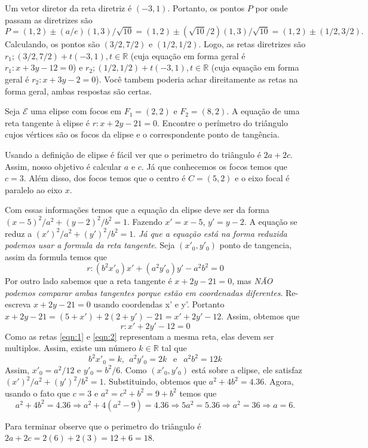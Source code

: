 \documentclass[11pt]{exam}
\begin{document}
\begin{questions}
\begin{parts}
\begin{solution}
       Um vetor diretor da reta diretriz é $(-3,1)$. Portanto, os pontos
       $P$ por onde passam as diretrizes são   
       $$P=(1,2)\pm (a/e)(1,3)/\sqrt{10}=(1,2)\pm (\sqrt{10}/2)(1,3)/\sqrt{10}=(1,2)\pm(1/2,3/2). $$
       Calculando, os pontos são $(3/2,7/2)$ e $(1/2,1/2)$.
       Logo, as retas diretrizes são 
       $r_{1}; (3/2,7/2)+t(-3,1), t \in \mathbb{R}$ 
       (cuja equação em forma geral é 
       $r_1: x+3y-12=0$) e 
       $r_{2}; (1/2,1/2)+t(-3,1), t \in \mathbb{R}$ 
       (cuja equação em forma geral é 
       $r_2: x+3y-2=0$). 
       Você tambem poderia achar direitamente 
       as retas na forma geral, ambas respostas são certas.  
       \end{solution}      
      \end{parts}
 \question[20] Seja $\mathcal{E}$ uma elipse com focos em 
 $F_1=(2,2)$ e $F_2=(8,2)$. A equação de uma reta tangente à elipse 
 é $r: x+2y-21=0$. Encontre o perímetro do triângulo cujos vértices são os focos da elipse e o correspondente ponto de tangência. 
   \begin{solution}
   Usando a definição de elipse é fácil ver que 
   o perimetro do triângulo é  $2a+2c$. Assim, nosso objetivo é calcular 
   $a$ e $c$. Já que conhecemos os focos temos que $c=3$. Além disso, dos focos temos que o centro é $C=(5,2)$ e o eixo focal é paralelo ao eixo $x$.
    
   Com essas informações temos que a equação da elipse deve ser 
   da forma $(x-5)^{2}/a^2+(y-2)^{2}/b^2=1$. Fazendo $x'=x-5$, $y'=y-2$. 
   A equação se reduz a  $(x')^{2}/a^2+(y')^{2}/b^2=1$.
   {\it Já que a equação está na forma reduzida podemos usar a formula da reta tangente}. Seja $(x'_0,y'_0)$ ponto de tangencia, assim da formula temos que 
   \begin{equation}\label{eqn:1}
     r: (b^2x'_{0})x'+(a^2 y'_0)y'-a^2b^2=0 
   \end{equation}      
   Por outro lado sabemos que a reta tangente é $x+2y-21=0$, mas {\it NÃO podemos comparar ambas tangentes porque estão em coordenadas diferentes}.
   Re-escreva  $x+2y-21=0$ usando coordendas x' e y'. 
   Portanto  $x+2y-21=(5+x')+2(2+y')-21=x'+2y'-12$. Assim, obtemos que 
   \begin{equation}\label{eqn:2}
     r: x'+2y'-12=0
   \end{equation}
     Como as retas \eqref{eqn:1} e \eqref{eqn:2} representam a mesma reta, elas devem ser multiplos. Assim, existe um número $k \in \mathbb{R}$
     tal que 
     $$  b^{2}x'_{0}=k , \ \  a^{2}y'_{0}=2k  \  \ \text{ e }  \  \ a^2b^{2}=12 k $$
     Assim, $x'_{0}=a^2/12$ e $y'_{0}=b^2/6.$ Como $(x'_0, y'_0)$ está sobre a elipse, ele satisfaz $(x')^{2}/a^2+(y')^{2}/b^2=1$. Substituindo, obtemos que $a^2+4b^2=4.36$. Agora, usando o fato que $c=3$ e 
     $a^{2}=c^{2}+b^{2}=9+b^2$ temos que 
     $$ a^2+4b^2=4.36 \Rightarrow a^{2}+4(a^{2}-9)=4.36 \Rightarrow 5a^{2}=5.36 \Rightarrow a^{2}=36
     \Rightarrow a=6.$$
     
     Para terminar observe que o perimetro do triângulo é 
    $2a+2c=2(6)+2(3)=12+6=18$.
    \end{solution}
 \end{questions}
 
\end{document}
